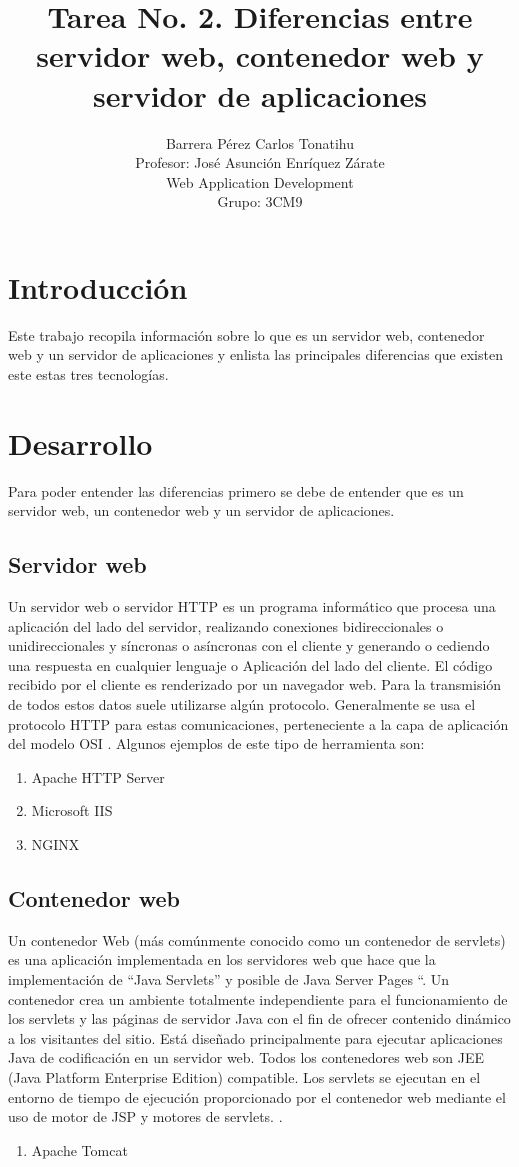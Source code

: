 \documentclass[a4paper,12pt]{article}
\title{Tarea No. 2. Diferencias entre servidor web, contenedor web y servidor de aplicaciones}
\author{Barrera Pérez Carlos Tonatihu \\ Profesor: José Asunción Enríquez Zárate \\ Web Application Development \\ Grupo: 3CM9 }
\begin{document}
\maketitle
\newpage
\tableofcontents

\newpage
\section{Introducción}
Este trabajo recopila información sobre lo que es un servidor web, contenedor 
web y un servidor de aplicaciones y enlista las principales diferencias que 
existen este estas tres tecnologías.

\section{Desarrollo}
Para poder entender las diferencias primero se debe de entender que es un servidor web, un contenedor web y un servidor de aplicaciones.
\subsection{Servidor web}
Un servidor web o servidor HTTP es un programa informático que procesa 
una aplicación del lado del servidor, realizando conexiones bidireccionales o 
unidireccionales y síncronas o asíncronas con el cliente y generando o cediendo 
una respuesta en cualquier lenguaje o Aplicación del lado del cliente. El código 
recibido por el cliente es renderizado por un navegador web. Para la transmisión 
de todos estos datos suele utilizarse algún protocolo. Generalmente se usa el 
protocolo HTTP para estas comunicaciones, perteneciente a la capa de aplicación 
del modelo OSI \cite{wiki}.
Algunos ejemplos de este tipo de herramienta son:
\begin{enumerate}
 \item Apache HTTP Server
 \item Microsoft IIS
 \item NGINX
\end{enumerate}

\subsection{Contenedor web}
Un contenedor Web (más comúnmente conocido como un contenedor de servlets) es 
una aplicación implementada en los servidores web que hace que la implementación 
de “Java Servlets” y posible de Java Server Pages “. Un contenedor crea un 
ambiente totalmente independiente para el funcionamiento de los servlets y las 
páginas de servidor Java con el fin de ofrecer contenido dinámico a los 
visitantes del sitio. Está diseñado principalmente para ejecutar aplicaciones 
Java de codificación en un servidor web. Todos los contenedores web son JEE 
(Java Platform Enterprise Edition) compatible. Los servlets se ejecutan en el 
entorno de tiempo de ejecución proporcionado por el contenedor web mediante el 
uso de motor de JSP y motores de servlets. \cite{jee}.
\begin{enumerate}
 \item Apache Tomcat
\end{enumerate}
\end{document}
